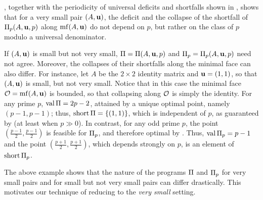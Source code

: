 \documentclass[11pt]{amsart}
\newcommand{\short}{\operatorname{short}}
\begin{document}
\begin{remark} \label{program behavior small: R}
   , together with the periodicity of universal deficits and shortfalls shown in , shows that for a very small pair $(A,\mathbf{u})$, the deficit and the collapse of the shortfall of  $\Pi_p(A,\mathbf{u},p)$ along $\operatorname{mf}(A, \mathbf{u})$ do not depend on $p$,  but rather on the class of $p$ modulo a universal denominator.
\end{remark}

\begin{example}
   If $(A, \mathbf{u})$ is small but not very small, $\Pi = \Pi(A,\mathbf{u},p)$ and $\Pi_p = \Pi_p(A,\mathbf{u},p)$ need not agree.
   Moreover, the collapses of their shortfalls along the minimal face can also differ.
   For instance, let $A$ be the $2 \times 2$ identity matrix and $\mathbf{u} = (1,1)$, so that $(A,\mathbf{u})$ is small, but not very small.
   Notice that in this case the minimal face $\mathcal{O} = \operatorname{mf}(A,\mathbf{u})$ is bounded, so that collapsing along $\mathcal{O}$ is simply the identity.
   For any prime $p$, $\operatorname{val} \Pi = 2p - 2$, attained by a unique optimal point, namely $(p-1,p-1)$; thus, $\short \IP = \{(1,1)\}$, which is independent of $p$, as guaranteed by   (at least when $p \gg 0$).
   In contrast, for any odd prime $p$, the point $(\frac{p-1}{2}, \frac{p-1}{2})$ is feasible for $\Pi_p$, and therefore optimal by .
   Thus, $\operatorname{val} \Pi_p = p-1$ and the point $(\frac{p+1}{2}, \frac{p+1}{2})$, which depends strongly on $p$, is an element of $\short \IP_p$.
\end{example}

The above example shows that the nature of the programs $\Pi$ and $\Pi_p$ for very small pairs and for small but not very small pairs can differ drastically.
This motivates our technique of reducing to the \emph{very small} setting.  
\end{document}
